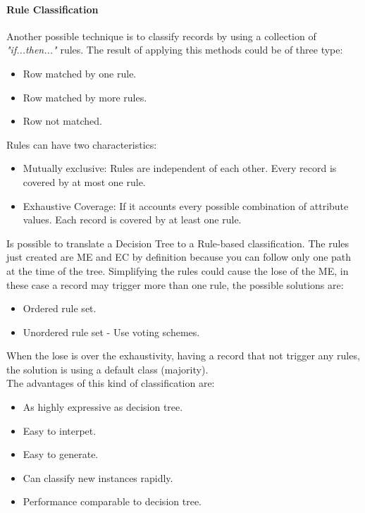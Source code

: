 \documentclass[12pt]{article}
\begin{document}
\paragraph{Rule Classification} Another possible technique is to classify records by using a collection of \textit{"if...then..."} rules. The result of applying this methods could be of three type:
\begin{itemize}
  \item Row matched by one rule.
  \item Row matched by more rules.
  \item Row not matched.
\end{itemize}
Rules can have two characteristics:
\begin{itemize}
  \item Mutually exclusive: Rules are independent of each other. Every record is covered by at most one rule.
  \item Exhaustive Coverage: If it accounts every possible combination of attribute values. Each record is covered by at least one rule.
\end{itemize}
Is possible to translate a Decision Tree to a Rule-based classification. The rules just created are ME and EC by definition because you can follow only one path at the time of the tree. Simplifying the rules could cause the lose of the ME, in these case a record may trigger more than one rule, the possible solutions are:
\begin{itemize}
  \item Ordered rule set.
  \item Unordered rule set - Use voting schemes.
\end{itemize}
When the lose is over the exhaustivity, having a record that not trigger any rules, the solution is using a default class (majority).\\
The advantages of this kind of classification are:
\begin{itemize}
  \item As highly expressive as decision tree.
  \item Easy to interpet.
  \item Easy to generate.
  \item Can classify new instances rapidly.
  \item Performance comparable to decision tree.
\end{itemize}
\end{document}

